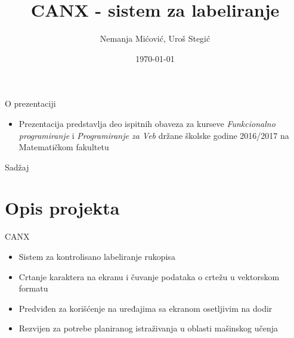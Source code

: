 \documentclass{beamer}
\title[CANX - sistem za labeliranje]{CANX - sistem za labeliranje}
\author{Nemanja Mićović, Uroš Stegić}
\institute{Matematički fakultet}
\date{\today}
\begin{document}
\begin{frame}
  \titlepage
\end{frame}

\begin{frame}{O prezentaciji}
    \begin{itemize}
        \item Prezentacija predstavlja deo ispitnih obaveza za kurseve \emph{Funkcionalno programiranje} i \emph{Programiranje za Veb}
            držane školske godine 2016/2017 na Matematičkom fakultetu
    \end{itemize}
\end{frame}

\begin{frame}{Sadžaj}
  \tableofcontents
\end{frame}

\section{Opis projekta}
\begin{frame}{CANX}
    \begin{itemize}
        \item Sistem za kontrolisano labeliranje rukopisa
        \item Crtanje karaktera na ekranu i čuvanje podataka o crtežu u vektorskom formatu
        \item Predviđen za korišćenje na uređajima sa ekranom osetljivim na dodir
        \item Rezvijen za potrebe planiranog istraživanja u oblasti mašinskog učenja
         
    \end{itemize}
\end{frame}
\end{document}
